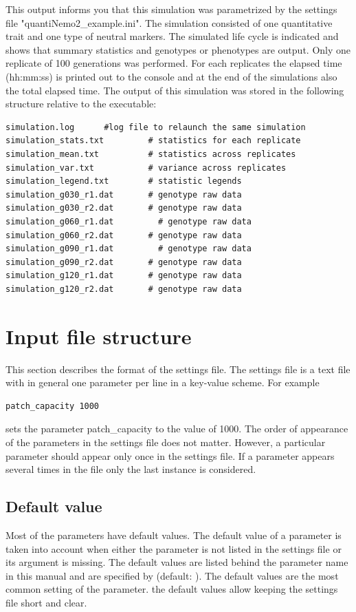 \documentclass[letterpaper,12pt,oneside]{book}
\begin{document}
This output informs you that this simulation was parametrized by the settings file "quantiNemo2\_example.ini". The simulation consisted of one quantitative trait and one type of neutral markers. The simulated life cycle is indicated and shows that summary statistics and genotypes or phenotypes are output. Only one replicate of 100 generations was performed. For each replicates the elapsed time (hh:mm:ss) is printed out to the console and at the end of the simulations also the total elapsed time. 
The output of this simulation was stored in the following structure relative to the executable:
\begin{lstlisting}[frame=single]
simulation.log      #log file to relaunch the same simulation
simulation_stats.txt         # statistics for each replicate
simulation_mean.txt          # statistics across replicates
simulation_var.txt           # variance across replicates
simulation_legend.txt        # statistic legends
simulation_g030_r1.dat       # genotype raw data 
simulation_g030_r2.dat       # genotype raw data 
simulation_g060_r1.dat         # genotype raw data 
simulation_g060_r2.dat       # genotype raw data 
simulation_g090_r1.dat         # genotype raw data 
simulation_g090_r2.dat       # genotype raw data 
simulation_g120_r1.dat       # genotype raw data 
simulation_g120_r2.dat       # genotype raw data 
\end{lstlisting}
\newpage
\chapter{Input file structure}\label{chap:InputFileStructure}
This section describes the format of the settings file. The settings file is a text file with in general one parameter per line in a key-value scheme. For example
\begin{lstlisting}[frame=single]
patch_capacity 1000
\end{lstlisting}
sets the parameter \textsf{patch\_capacity} to the value of 1000. The order of appearance of the parameters in the settings file does not matter. However, a particular parameter should appear only once in the settings file. If a parameter appears several times in the file only the last instance is considered. 

\section{Default value}
Most of the parameters have default values. The default value of a parameter is taken into account when either the parameter is not listed in the settings file or its argument is missing. The default values are listed behind the parameter name in this manual and are specified by \textsf{(default: )}. The default values are the most common setting of the parameter. the default values allow keeping the settings file short and clear.  
\end{document}
